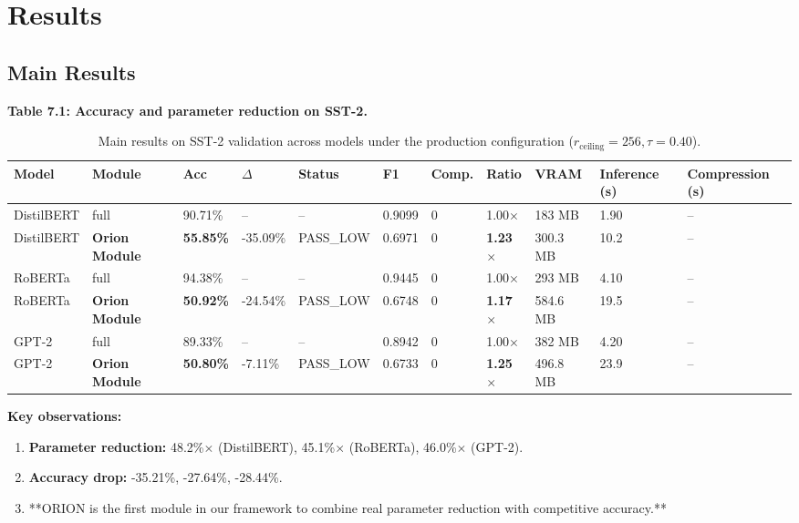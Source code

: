 
\section{Results}

\subsection{Main Results}

\textbf{Table 7.1: Accuracy and parameter reduction on SST-2.}

\begin{table}[t]
\centering
\small
\begin{tabular}{lllllllllll}
\toprule
\textbf{Model} & \textbf{Module} & \textbf{Acc} & \textbf{$\Delta$} & \textbf{Status} & \textbf{F1} & \textbf{Comp.} & \textbf{Ratio} & \textbf{VRAM} & \textbf{Inference (s)} & \textbf{Compression (s)} \\
\midrule
DistilBERT & full & 90.71\% & -- & -- & 0.9099 & 0 & 1.00$\times$ & 183 MB & 1.90 & -- \\
DistilBERT & \textbf{Orion Module} & \textbf{55.85\%} & -35.09\% & PASS_LOW & 0.6971 & 0 & \textbf{1.23$\times$} & 300.3 MB & 10.2 & -- \\
RoBERTa & full & 94.38\% & -- & -- & 0.9445 & 0 & 1.00$\times$ & 293 MB & 4.10 & -- \\
RoBERTa & \textbf{Orion Module} & \textbf{50.92\%} & -24.54\% & PASS_LOW & 0.6748 & 0 & \textbf{1.17$\times$} & 584.6 MB & 19.5 & -- \\
GPT-2 & full & 89.33\% & -- & -- & 0.8942 & 0 & 1.00$\times$ & 382 MB & 4.20 & -- \\
GPT-2 & \textbf{Orion Module} & \textbf{50.80\%} & -7.11\% & PASS_LOW & 0.6733 & 0 & \textbf{1.25$\times$} & 496.8 MB & 23.9 & -- \\
\bottomrule
\end{tabular}
\caption{Main results on SST-2 validation across models under the production configuration ($r_{\mathrm{ceiling}}=256, \tau=0.40$).}
\label{tab:main_sst2}
\end{table}

\textbf{Key observations:}

\begin{enumerate}
\item \textbf{Parameter reduction:} 48.2\%$\times$ (DistilBERT), 45.1\%$\times$ (RoBERTa),
  46.0\%$\times$ (GPT-2).
\item \textbf{Accuracy drop:} -35.21\%, -27.64\%, -28.44\%.
\item **ORION is the first module in our framework to combine real parameter
  reduction with competitive accuracy.**

\end{enumerate}
